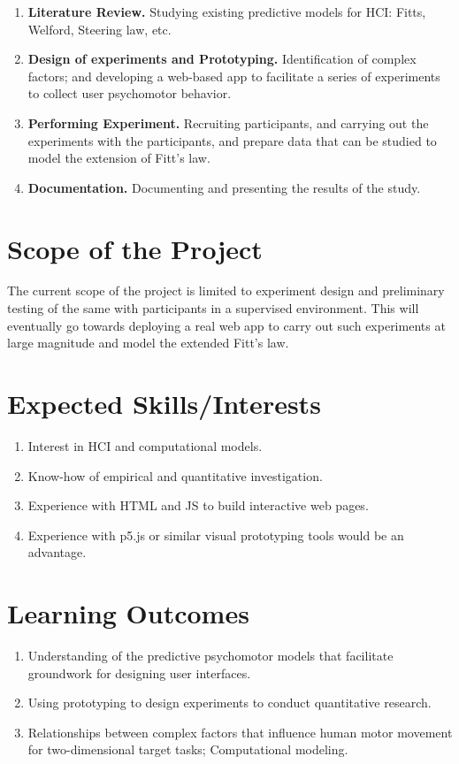 \documentclass	[a4paper,11pt, hidelinks]{article}
\theoremstyle	{definition}
\begin{document}
\begin{enumerate}
  \item \textbf{Literature Review.} Studying existing predictive models for HCI: Fitts, Welford, Steering law, etc.
  \item \textbf{Design of experiments and Prototyping.} Identification of complex factors; and developing a web-based app to facilitate a series of experiments to collect user psychomotor behavior.
  \item \textbf{Performing Experiment.} Recruiting participants, and carrying out the experiments with the participants, and prepare data that can be studied to model the extension of Fitt’s law.
  \item \textbf{Documentation.} Documenting and presenting the results of the study.
\end{enumerate}

\section{Scope of the Project}
The current scope of the project is limited to experiment design and preliminary testing of the same with participants in a supervised environment.  This will eventually go towards deploying a real web app to carry out such experiments at large magnitude and model the extended Fitt’s law.

\section{Expected Skills/Interests}
\begin{enumerate}
  \item Interest in HCI and computational models.
  \item Know-how of empirical and quantitative investigation.
  \item Experience with HTML and JS to build interactive web pages.
  \item Experience with p5.js or similar visual prototyping tools would be an advantage.
\end{enumerate}

\section{Learning Outcomes}
\begin{enumerate}
  \item Understanding of the predictive psychomotor models that facilitate groundwork for designing user interfaces.
  \item Using prototyping to design experiments to conduct quantitative research.
  \item Relationships between complex factors that influence human motor movement for two-dimensional target tasks; Computational modeling.
\end{enumerate}
\end{document}
